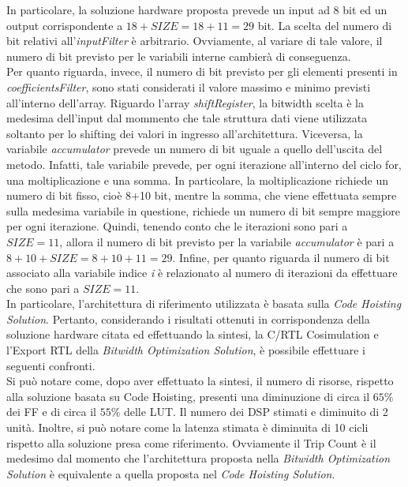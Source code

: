 In particolare, la soluzione hardware proposta prevede un input ad 8 bit ed un output corrispondente a $18+SIZE = 18+11 = 29$ bit. La scelta del numero di bit relativi all'\textit{inputFilter} è arbitrario. Ovviamente, al variare di tale valore, il numero di bit previsto per le variabili interne cambierà di conseguenza. \\
Per quanto riguarda, invece, il numero di bit previsto per gli elementi presenti in \textit{coefficientsFilter}, sono stati considerati il valore massimo e minimo previsti all'interno dell'array. Riguardo l'array \textit{shiftRegister}, la bitwidth scelta è la medesima dell'input dal mommento che tale struttura dati viene utilizzata soltanto per lo shifting dei valori in ingresso all'architettura. Viceversa, la variabile \textit{accumulator} prevede un numero di bit uguale a quello dell'uscita del metodo. Infatti, tale variabile prevede, per ogni iterazione all'interno del ciclo for, una moltiplicazione e una somma. In particolare, la moltiplicazione richiede un numero di bit fisso, cioè 8+10 bit, mentre la somma, che viene effettuata sempre sulla medesima variabile in questione, richiede un numero di bit sempre maggiore per ogni iterazione. Quindi, tenendo conto che le iterazioni sono pari a $SIZE=11$, allora il numero di bit previsto per la variabile \textit{accumulator} è pari a $8+10+SIZE = 8+10+11 = 29$. Infine, per quanto riguarda il numero di bit associato alla variabile indice \textit{i} è relazionato al numero di iterazioni da effettuare che sono pari a $SIZE=11$.
\\
In particolare, l'architettura di riferimento utilizzata è basata sulla \textit{Code Hoisting Solution}. Pertanto, considerando i risultati ottenuti in corrispondenza della soluzione hardware citata ed effettuando la sintesi, la C/RTL Cosimulation e l'Export RTL della \textit{Bitwidth Optimization Solution}, è possibile effettuare i seguenti confronti.
\\
Si può notare come, dopo aver effettuato la sintesi, il numero di risorse, rispetto alla soluzione basata su Code Hoisting, presenti una diminuzione di circa il $65\%$ dei FF e di circa il $55\%$ delle LUT. Il numero dei DSP stimati e diminuito di 2 unità. Inoltre, si può notare come la latenza stimata è diminuita di 10 cicli rispetto alla soluzione presa come riferimento. Ovviamente il Trip Count è il medesimo dal momento che l'architettura proposta nella \textit{Bitwidth Optimization Solution} è equivalente a quella proposta nel \textit{Code Hoisting Solution}.

